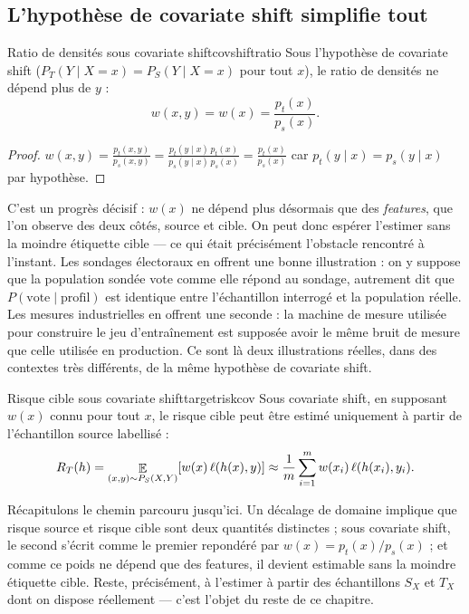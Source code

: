 \documentclass[11pt]{article}
\begin{document}
\subsection{L'hypothèse de covariate shift simplifie tout}

\begin{proposition}{Ratio de densités sous covariate shift}{covshiftratio}
Sous l'hypothèse de covariate shift ($P_T(Y\mid X=x)=P_S(Y\mid X=x)$ pour tout $x$), le ratio de densités
ne dépend plus de $y$ :
\[
w(x,y) = w(x) = \frac{p_t(x)}{p_s(x)}.
\]
\end{proposition}
\begin{proof}
$\displaystyle w(x,y) = \frac{p_t(x,y)}{p_s(x,y)} = \frac{p_t(y\mid x)\,p_t(x)}{p_s(y\mid x)\,p_s(x)}
= \frac{p_t(x)}{p_s(x)}$ car $p_t(y\mid x)=p_s(y\mid x)$ par hypothèse. \qedhere
\end{proof}

C'est un progrès décisif : $w(x)$ ne dépend plus désormais que des \emph{features}, que l'on observe des
deux côtés, source et cible. On peut donc espérer l'estimer sans la moindre étiquette cible --- ce qui
était précisément l'obstacle rencontré à l'instant. Les sondages électoraux en offrent une bonne
illustration : on y suppose que la population sondée vote comme elle répond au sondage, autrement dit que
$P(\text{vote}\mid \text{profil})$ est identique entre l'échantillon interrogé et la population réelle.
Les mesures industrielles en offrent une seconde : la machine de mesure utilisée pour construire le jeu
d'entraînement est supposée avoir le même bruit de mesure que celle utilisée en production. Ce sont là
deux illustrations réelles, dans des contextes très différents, de la même hypothèse de covariate shift.

\begin{proposition}{Risque cible sous covariate shift}{targetriskcov}
Sous covariate shift, en supposant $w(x)$ connu pour tout $x$, le risque cible peut être estimé
uniquement à partir de l'échantillon source labellisé :
\[
R_T(h) = \mathop{\mathbb{E}}_{(x,y)\sim P_S(X,Y)}\!\left[w(x)\,\ell(h(x),y)\right] \approx \frac1m\sum_{i=1}^m w(x_i)\,\ell(h(x_i),y_i).
\]
\end{proposition}

Récapitulons le chemin parcouru jusqu'ici. Un décalage de domaine implique que risque source et risque
cible sont deux quantités distinctes ; sous covariate shift, le second s'écrit comme le premier
repondéré par $w(x)=p_t(x)/p_s(x)$ ; et comme ce poids ne dépend que des features, il devient estimable
sans la moindre étiquette cible. Reste, précisément, à l'estimer à partir des échantillons $S_X$ et
$T_X$ dont on dispose réellement --- c'est l'objet du reste de ce chapitre.
\end{document}
